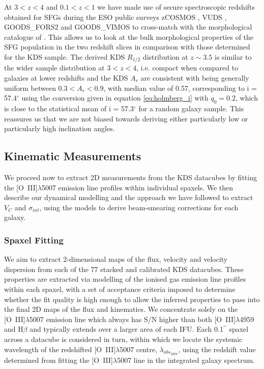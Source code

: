 \documentclass[fleqn,usenatbib]{mn2e}
\begin{document}
At $3 < z < 4$ and $0.1 < z < 1$ we have made use of secure spectroscopic redshifts obtained for SFGs during the ESO public surveys zCOSMOS \citep{Lilly2007}, VUDS \citep{Tasca2016}, GOODS\_FORS2 \citep{Vanzella2005,Vanzella2006,Vanzella2008} and GOODS\_VIMOS \citep{Balestra2010} to cross-match with the morphological catalogue of \cite{VanderWel2012}.
This allows us to look at the bulk morphological properties of the SFG population in the two redshift slices in comparison with those determined for the KDS sample.
The derived KDS $R_{1/2}$ distribution at $z \sim 3.5$ is similar to the wider sample distribution at $3 < z  < 4$, i.e. compact when compared to galaxies at lower redshifts and the KDS $A_{r}$ are consistent with being generally uniform between $0.3 < A_{r} < 0.9$, with median value of 0.57, corresponding to i = 57.4$^{\circ}$ using the conversion given in equation \ref{eq:holmberg_i} with $q_{0}=0.2$, which is close to the statistical mean of i = 57.3$^{\circ}$ for a random galaxy sample.
This reassures us that we are not biased towards deriving either particularly low or particularly high inclination angles.

\subsection{Kinematic Measurements}\label{subsection:kinematic_measurements}

We proceed now to extract 2D measurements from the KDS datacubes by fitting the [O~{\sc III}]$\lambda$5007 emission line profiles within individual spaxels.
We then describe our dynamical modelling and the approach we have followed to extract $V_{C}$ and $\sigma_{int}$, using the models to derive beam-smearing corrections for each galaxy.  

\subsubsection{Spaxel Fitting}\label{subsubsection:spaxel_fitting}
We aim to extract 2-dimensional maps of the flux, velocity and velocity dispersion from each of the 77 stacked and calibrated KDS datacubes.
These properties are extracted via modelling of the ionised gas emission line profiles within each spaxel, with a set of acceptance criteria imposed to determine whether the fit quality is high enough to allow the inferred properties to pass into the final 2D maps of the flux and kinematics.
We concentrate solely on the [O~{\sc III}]$\lambda$5007 emission line which always has S/N higher than both [O~{\sc III}]$\lambda$4959 and H$\beta$ and typically extends over a larger area of each IFU.
Each 0.1$^{\prime\prime}$ spaxel across a datacube is considered in turn, within which we locate the systemic wavelength of the redshifted [O~{\sc III}]$\lambda$5007 centre, $\lambda_{obs_{5007}}$, using the redshift value determined from fitting the [O~{\sc III}]$\lambda$5007 line in the integrated galaxy spectrum. \\
\end{document}
